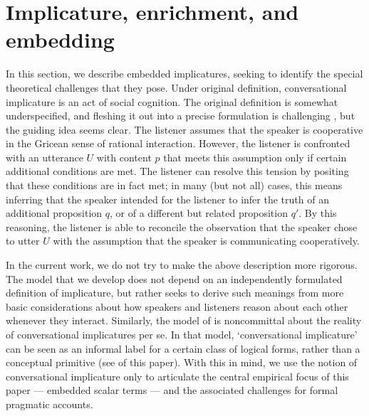 \documentclass[leqno,12pt]{article}
\begin{document}
\section{Implicature, enrichment, and embedding}\label{sec:implicature}


In this section, we describe embedded implicatures, seeking to
identify the special theoretical challenges that they pose.  Under
 original definition, conversational implicature is
an act of social cognition. The original definition is somewhat
underspecified, and fleshing it out into a precise formulation is
challenging \citep{Hirschberg85}, but the guiding idea seems clear.
The listener assumes that the speaker is cooperative in the Gricean
sense of rational interaction. However, the listener is confronted
with an utterance $U$ with content $p$ that meets this assumption only
if certain additional conditions are met. The listener can resolve
this tension by positing that these conditions are in fact met; in
many (but not all) cases, this means inferring that the speaker
intended for the listener to infer the truth of an additional
proposition $q$, or of a different but related proposition $q'$. By
this reasoning, the listener is able to reconcile the observation that
the speaker chose to utter $U$ with the assumption that the speaker is
communicating cooperatively.

In the current work, we do not try to make the above description more
rigorous. The model that we develop does not depend on an
independently formulated definition of implicature, but rather seeks
to derive such meanings from more basic considerations about how
speakers and listeners reason about each other whenever they
interact. Similarly, the model of \citet{ChierchiaFoxSpector08} is
noncommittal about the reality of conversational implicatures per
se. In that model, `conversational implicature' can be seen as an informal
label for a certain class of logical forms, rather than a conceptual
primitive (see  of this paper). With this in mind, we
use the notion of conversational implicature only to articulate the
central empirical focus of this paper --- embedded scalar terms ---
and the associated challenges for formal pragmatic accounts.
\end{document}
